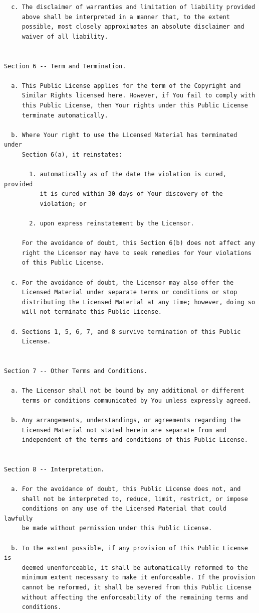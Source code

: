 \documentclass[12pt,spanish,]{article}
\begin{document}
\begin{verbatim}
  c. The disclaimer of warranties and limitation of liability provided
     above shall be interpreted in a manner that, to the extent
     possible, most closely approximates an absolute disclaimer and
     waiver of all liability.


Section 6 -- Term and Termination.

  a. This Public License applies for the term of the Copyright and
     Similar Rights licensed here. However, if You fail to comply with
     this Public License, then Your rights under this Public License
     terminate automatically.

  b. Where Your right to use the Licensed Material has terminated under
     Section 6(a), it reinstates:

       1. automatically as of the date the violation is cured, provided
          it is cured within 30 days of Your discovery of the
          violation; or

       2. upon express reinstatement by the Licensor.

     For the avoidance of doubt, this Section 6(b) does not affect any
     right the Licensor may have to seek remedies for Your violations
     of this Public License.

  c. For the avoidance of doubt, the Licensor may also offer the
     Licensed Material under separate terms or conditions or stop
     distributing the Licensed Material at any time; however, doing so
     will not terminate this Public License.

  d. Sections 1, 5, 6, 7, and 8 survive termination of this Public
     License.


Section 7 -- Other Terms and Conditions.

  a. The Licensor shall not be bound by any additional or different
     terms or conditions communicated by You unless expressly agreed.

  b. Any arrangements, understandings, or agreements regarding the
     Licensed Material not stated herein are separate from and
     independent of the terms and conditions of this Public License.


Section 8 -- Interpretation.

  a. For the avoidance of doubt, this Public License does not, and
     shall not be interpreted to, reduce, limit, restrict, or impose
     conditions on any use of the Licensed Material that could lawfully
     be made without permission under this Public License.

  b. To the extent possible, if any provision of this Public License is
     deemed unenforceable, it shall be automatically reformed to the
     minimum extent necessary to make it enforceable. If the provision
     cannot be reformed, it shall be severed from this Public License
     without affecting the enforceability of the remaining terms and
     conditions.


\end{verbatim}
\end{document}

